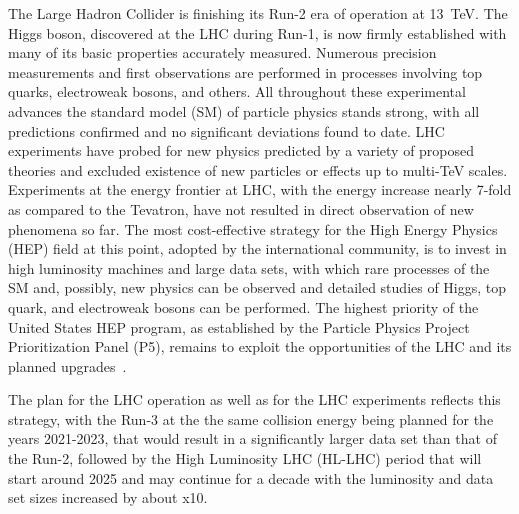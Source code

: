 \noindent
The Large Hadron Collider is finishing its Run-2 era of operation at 13~TeV. The Higgs boson, discovered at the LHC during Run-1, is now firmly established with many of its basic properties accurately measured. Numerous precision measurements and first observations are performed in processes involving top quarks, electroweak bosons, and others. All throughout these experimental advances the standard model (SM) of particle physics stands strong, with all predictions confirmed and no significant deviations found to date. LHC experiments have probed for new physics predicted by a variety of proposed theories and excluded existence of new particles or effects up to multi-TeV scales. Experiments at the energy frontier at LHC, with the energy increase nearly 7-fold as compared to the Tevatron, have not resulted in direct observation of new phenomena so far. The most cost-effective strategy for the High Energy Physics (HEP) field at this point, adopted by the international community, is to invest in high luminosity machines and large data sets, with which rare processes of the SM and, possibly, new physics can be observed and detailed studies of Higgs, top quark, and electroweak bosons can be performed. The highest priority of the United States HEP program, as established by the Particle Physics Project Prioritization Panel (P5), remains to exploit the opportunities of the LHC and its planned upgrades~\cite{bib:P5}.

The plan for the LHC operation as well as for the LHC experiments reflects this strategy, with the Run-3 at the the same collision energy being planned for the years 2021-2023, that would result in a significantly larger data set than that of the Run-2, followed by the High Luminosity LHC (HL-LHC) period that will start around 2025 and may continue for a decade with the luminosity and data set sizes increased by about x10.

